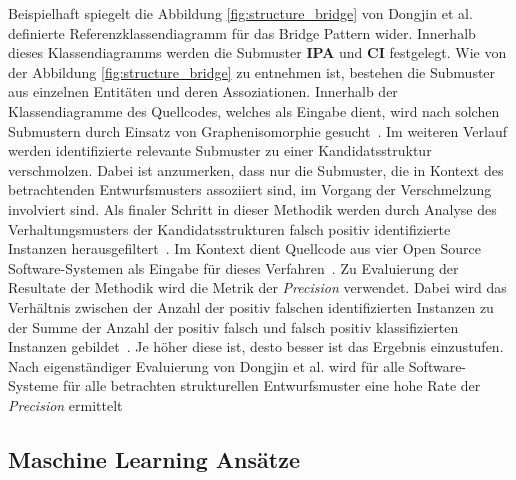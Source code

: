 Beispielhaft spiegelt die Abbildung \ref{fig:structure_bridge} von Dongjin et al. definierte Referenzklassendiagramm für das Bridge Pattern wider. Innerhalb dieses Klassendiagramms werden die Submuster \textbf{IPA} und \textbf{CI} festgelegt. Wie von der Abbildung \ref{fig:structure_bridge} zu entnehmen ist, bestehen die Submuster aus einzelnen Entitäten und deren Assoziationen.
Innerhalb der Klassendiagramme des Quellcodes, welches als Eingabe dient, wird nach solchen Submustern durch Einsatz von Graphenisomorphie gesucht~\cite[S. 584]{6649882}. Im weiteren Verlauf werden identifizierte relevante Submuster zu einer Kandidatsstruktur verschmolzen. Dabei ist anzumerken, dass nur die Submuster, die in Kontext des betrachtenden Entwurfsmusters assoziiert sind, im Vorgang der Verschmelzung involviert sind.
Als finaler Schritt in dieser Methodik werden durch Analyse des Verhaltungsmusters der Kandidatsstrukturen falsch positiv identifizierte Instanzen herausgefiltert~\cite[S. 584]{6649882}. Im Kontext dient Quellcode aus vier Open Source Software-Systemen als Eingabe für dieses Verfahren~\cite[S. 585]{6649882}. 
Zu Evaluierung der Resultate der Methodik wird die Metrik der \textit{Precision} verwendet. Dabei wird das Verhältnis zwischen der Anzahl der positiv falschen identifizierten Instanzen zu der Summe der Anzahl der positiv falsch und falsch positiv klassifizierten Instanzen gebildet~\cite[S. 585]{6649882}. Je höher diese ist, desto besser ist das Ergebnis einzustufen.
Nach eigenständiger Evaluierung von Dongjin et al. wird für alle Software-Systeme für alle betrachten strukturellen Entwurfsmuster eine hohe Rate der \textit{Precision} ermittelt~\cite[S. 586]{6649882}


\pagebreak

\subsection{Maschine Learning Ansätze}

